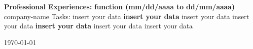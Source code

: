\documentclass[a4paper,10pt]{report}
\begin{document}
\begin{flushleft}
   \linebreak
  \textbf{Professional Experiences:}
  \vspace*{0.5\baselineskip}
  \linebreak
  \textbf{function (mm/dd/aaaa to dd/mm/aaaa)}
  \linebreak
  company-name
  \linebreak
  Tasks: insert your data
  \vspace*{0.5\baselineskip}
  \linebreak
  \textbf{insert your data}
  \linebreak
  insert your data
  \linebreak
  insert your data
  \vspace*{0.5\baselineskip}
  \linebreak
  \textbf{insert your data}
  \linebreak
  insert your data
  \linebreak
  insert your data
  \vspace*{0.5\baselineskip}
  \linebreak
  \end{flushleft}
  \begin{center}
    \today
\end{center}
\end{document}
